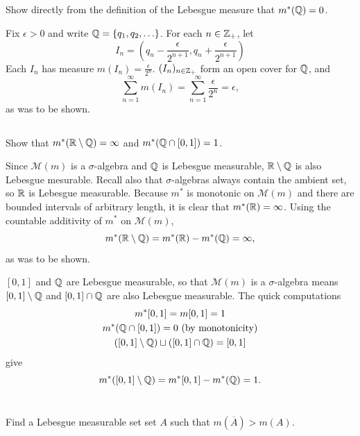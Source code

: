\documentclass[12pt]{article}
\begin{document}
\subsection{} 
Show directly from the definition of the Lebesgue measure that $m^{*}(\mathbb{Q}) = 0$. 

\noindent\dotfill 

Fix $\epsilon > 0$ and write $\mathbb{Q} = \{q_1, q_2, \ldots\}$. 
For each $n \in \mathbb{Z}_{+}$, let 
$$I_n = (q_n - \frac{\epsilon}{2^{n + 1}}, q_n + \frac{\epsilon}{2^{n + 1}})$$
Each $I_n$ has measure $m(I_n) = \frac{\epsilon}{2^n}$. 
$(I_n)_{n \in \mathbb{Z}_{+}}$ form an open cover for $\mathbb{Q}$, and 
$$\sum_{n = 1}^{\infty} m(I_n) = \sum_{n = 1}^{\infty} \frac{\epsilon}{2^{n}} = \epsilon,$$
as was to be shown. 

\subsection{} 
Show that $m^{*}(\mathbb{R} \setminus \mathbb{Q}) = \infty$ and $m^{*} (\mathbb{Q} \cap [0, 1]) = 1$. 

\noindent\dotfill

Since $\mathscr{M}(m)$ is a $\sigma$-algebra and $\mathbb{Q}$ is Lebesgue measurable, $\mathbb{R} \setminus \mathbb{Q}$ is also Lebesgue mesurable. 
Recall also that $\sigma$-algebras always contain the ambient set, so $\mathbb{R}$ is Lebesgue measurable. 
Because $m^{*}$ is monotonic on $\mathscr{M}(m)$ and there are bounded intervals of arbitrary length, it is clear that $m^{*}(\mathbb{R}) = \infty$. 
Using the countable additivity of $m^{*}$ on $\mathscr{M}(m)$, 
$$m^{*}(\mathbb{R} \setminus \mathbb{Q}) = m^{*} (\mathbb{R}) - m^{*} (\mathbb{Q}) = \infty,$$
as was to be shown. 

$[0, 1]$ and $\mathbb{Q}$ are Lebesgue measurable, so that $\mathscr{M}(m)$ is a $\sigma$-algebra means $[0, 1] \setminus \mathbb{Q}$ and $[0, 1] \cap \mathbb{Q}$ are also Lebesgue measurable. 
The quick computations 
\begin{gather*}
  m^{*}[0, 1] = m[0, 1] = 1 \\ 
  m^{*}(\mathbb{Q} \cap [0, 1]) = 0 \text{ (by monotonicity)} \\
  ([0, 1] \setminus \mathbb{Q}) \sqcup ([0, 1] \cap \mathbb{Q}) = [0, 1]
\end{gather*} 
give
$$m^{*} ([0, 1] \setminus \mathbb{Q}) = m^{*}[0, 1] - m^{*}(\mathbb{Q}) = 1.$$

\section{} 
\subsection{} 
Find a Lebesgue measurable set set $A$ such that $m(\overline{A}) > m(A)$. 
\end{document}
